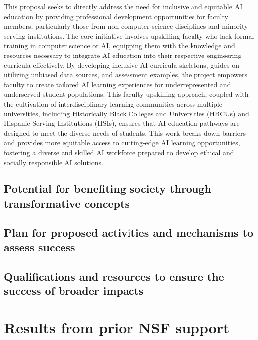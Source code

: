 \documentclass[11pt]{article}
\begin{document}
This proposal seeks to directly address the need for inclusive and equitable AI education by providing professional development opportunities for faculty members, particularly those from non-computer science disciplines and minority-serving institutions. The core initiative involves upskilling faculty who lack formal training in computer science or AI, equipping them with the knowledge and resources necessary to integrate AI education into their respective engineering curricula effectively. By developing inclusive AI curricula skeletons, guides on utilizing unbiased data sources, and assessment examples, the project empowers faculty to create tailored AI learning experiences for underrepresented and underserved student populations. This faculty upskilling approach, coupled with the cultivation of interdisciplinary learning communities across multiple universities, including Historically Black Colleges and Universities (HBCUs) and Hispanic-Serving Institutions (HSIs), ensures that AI education pathways are designed to meet the diverse needs of students. This work breaks down barriers and provides more equitable access to cutting-edge AI learning opportunities, fostering a diverse and skilled AI workforce prepared to develop ethical and socially responsible AI solutions.

\subsection{Potential for benefiting society through transformative concepts} 

\subsection{Plan for proposed activities and mechanisms to assess success} 

\subsection{Qualifications and resources to ensure the success of broader impacts}

\section{Results from prior NSF support}  
\end{document}
